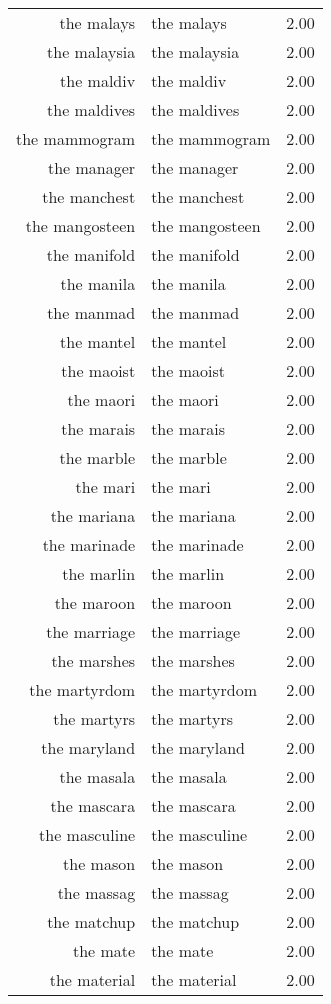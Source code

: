 \begin{table}[ht]
\begin{tabular}{rlr}
  the malays & the malays & 2.00 \\ 
  the malaysia & the malaysia & 2.00 \\ 
  the maldiv & the maldiv & 2.00 \\ 
  the maldives & the maldives & 2.00 \\ 
  the mammogram & the mammogram & 2.00 \\ 
  the manager & the manager & 2.00 \\ 
  the manchest & the manchest & 2.00 \\ 
  the mangosteen & the mangosteen & 2.00 \\ 
  the manifold & the manifold & 2.00 \\ 
  the manila & the manila & 2.00 \\ 
  the manmad & the manmad & 2.00 \\ 
  the mantel & the mantel & 2.00 \\ 
  the maoist & the maoist & 2.00 \\ 
  the maori & the maori & 2.00 \\ 
  the marais & the marais & 2.00 \\ 
  the marble & the marble & 2.00 \\ 
  the mari & the mari & 2.00 \\ 
  the mariana & the mariana & 2.00 \\ 
  the marinade & the marinade & 2.00 \\ 
  the marlin & the marlin & 2.00 \\ 
  the maroon & the maroon & 2.00 \\ 
  the marriage & the marriage & 2.00 \\ 
  the marshes & the marshes & 2.00 \\ 
  the martyrdom & the martyrdom & 2.00 \\ 
  the martyrs & the martyrs & 2.00 \\ 
  the maryland & the maryland & 2.00 \\ 
  the masala & the masala & 2.00 \\ 
  the mascara & the mascara & 2.00 \\ 
  the masculine & the masculine & 2.00 \\ 
  the mason & the mason & 2.00 \\ 
  the massag & the massag & 2.00 \\ 
  the matchup & the matchup & 2.00 \\ 
  the mate & the mate & 2.00 \\ 
  the material & the material & 2.00 \\ 

\end{tabular}
\end{table}
